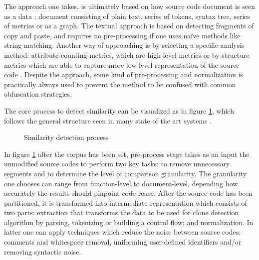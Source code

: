 The approach one takes, is ultimately based on how source code document is seen as a data \cite{Roy:2009:CEC:1530898.1531101}: document consisting of plain text, series of tokens, syntax tree, series of metrics or as a graph. The textual approach is based on detecting fragments of copy and paste, and requires no pre-processing if one uses naïve methods like string matching. Another way of approaching is by selecting a specific analysis method: attribute-counting-metrics, which are high-level metrics or by structure-metrics which are able to capture more low level representation of the source code \cite{Verco:1996:SDS:369585.369598}. Despite the approach, some kind of pre-processing and normalization is practically always used to prevent the method to be confused with common obfuscation strategies. 

The core process to detect similarity can be visualized as in figure \ref{fig-sd-flow}, which follows the general structure seen in many state of the art systems \cite{Roy:2009:CEC:1530898.1531101}.

\begin{figure}[!ht]
\centering
\vspace{0.5cm}
\caption{Similarity detection process}
\label{fig-sd-flow}
\end{figure}

\noindent
In figure \ref{fig-sd-flow} after the corpus has been set, pre-process stage takes as an input the unmodified source codes to perform two key tasks: to remove unnecessary segments and to determine the level of comparison granularity. The granularity one chooses can range from function-level to document-level, depending how accurately the results should pinpoint code reuse. After the source code has been partitioned, it is transformed into intermediate representation which consists of two parts: extraction that transforms the data to be used for clone detection algorithm \eg by parsing, tokenizing or building a control flow; and normalization. In latter one can apply techniques which reduce the noise between source codes: comments and whitespace removal, uniforming user-defined identifiers and/or removing syntactic noise.

